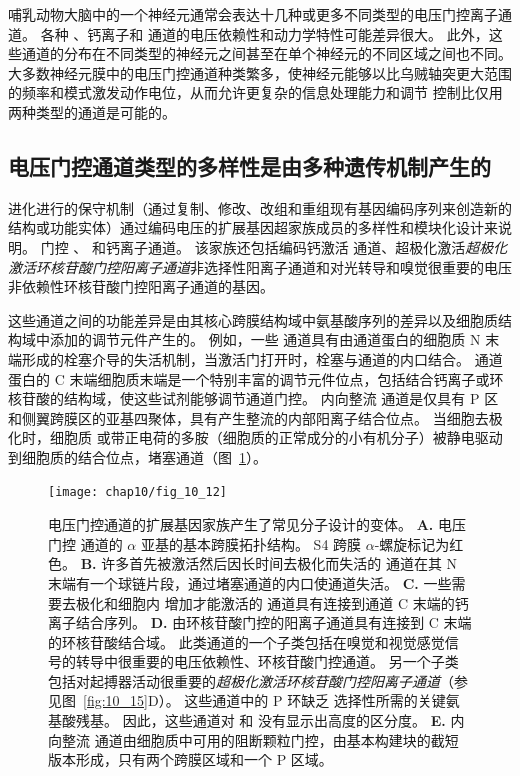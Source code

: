 哺乳动物大脑中的一个神经元通常会表达十几种或更多不同类型的电压门控离子通道。
各种 、钙离子和  通道的电压依赖性和动力学特性可能差异很大。
此外，这些通道的分布在不同类型的神经元之间甚至在单个神经元的不同区域之间也不同。
大多数神经元膜中的电压门控通道种类繁多，使神经元能够以比乌贼轴突更大范围的频率和模式激发动作电位，从而允许更复杂的信息处理能力和调节 控制比仅用两种类型的通道是可能的。



\subsection{电压门控通道类型的多样性是由多种遗传机制产生的}

进化进行的保守机制（通过复制、修改、改组和重组现有基因编码序列来创造新的结构或功能实体）通过编码电压的扩展基因超家族成员的多样性和模块化设计来说明。 
门控 、 和钙离子通道。
该家族还包括编码钙激活  通道、超极化激活\textit{超极化激活环核苷酸门控阳离子通道}非选择性阳离子通道和对光转导和嗅觉很重要的电压非依赖性环核苷酸门控阳离子通道的基因。


这些通道之间的功能差异是由其核心跨膜结构域中氨基酸序列的差异以及细胞质结构域中添加的调节元件产生的。 
例如，一些  通道具有由通道蛋白的细胞质 N 末端形成的栓塞介导的失活机制，当激活门打开时，栓塞与通道的内口结合。
通道蛋白的 C 末端细胞质末端是一个特别丰富的调节元件位点，包括结合钙离子或环核苷酸的结构域，使这些试剂能够调节通道门控。
内向整流  通道是仅具有 P 区和侧翼跨膜区的亚基四聚体，具有产生整流的内部阳离子结合位点。
当细胞去极化时，细胞质  或带正电荷的多胺（细胞质的正常成分的小有机分子）被静电驱动到细胞质的结合位点，堵塞通道（图~\ref{fig:10_12}）。


\begin{figure}[htbp]
	\centering
	\texttt{[image: chap10/fig\_10\_12]}
	\caption{电压门控通道的扩展基因家族产生了常见分子设计的变体。
		\textbf{A.} 电压门控  通道的 $\alpha$ 亚基的基本跨膜拓扑结构。
		S4 跨膜 $\alpha$-螺旋标记为红色。
		\textbf{B.} 许多首先被激活然后因长时间去极化而失活的  通道在其 N 末端有一个球链片段，通过堵塞通道的内口使通道失活。
		\textbf{C.} 一些需要去极化和细胞内  增加才能激活的  通道具有连接到通道 C 末端的钙离子结合序列。
		\textbf{D.} 由环核苷酸门控的阳离子通道具有连接到 C 末端的环核苷酸结合域。
		此类通道的一个子类包括在嗅觉和视觉感觉信号的转导中很重要的电压依赖性、环核苷酸门控通道。
		另一个子类包括对起搏器活动很重要的\textit{超极化激活环核苷酸门控阳离子通道}（参见图~\ref{fig:10_15}D）。
		这些通道中的 P 环缺乏  选择性所需的关键氨基酸残基。
		因此，这些通道对  和  没有显示出高度的区分度。
		\textbf{E.} 内向整流  通道由细胞质中可用的阻断颗粒门控，由基本构建块的截短版本形成，只有两个跨膜区域和一个 P 区域。}
	\label{fig:10_12}
\end{figure}


